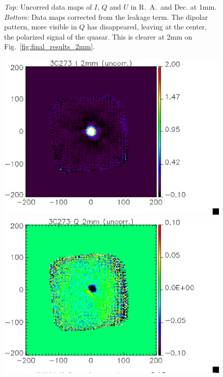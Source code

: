 \documentclass[a4paper,10pt]{article}
\begin{document}
\begin{figure}
\begin{center}
\caption{\emph{Top:} Uncorred data maps of $I$, $Q$ and $U$ in R.~A.~and Dec. at
  1mm. \emph{Bottom:} Data maps corrected from the leakage term. The dipolar
  pattern, more visible in $Q$ has disappeared, leaving at the center, the
  polarized signal of the quasar. This is clearer at 2mm on Fig.~\ref{fig:final_results_2mm}.}
\label{fig:final_results_1mm}
\end{center}
\end{figure}

\begin{figure}
\begin{center}
\includegraphics[clip, angle=0, scale = 0.3]{figures/I_3C273_2mm_uncorr.eps}
\includegraphics[clip, angle=0, scale = 0.3]{figures/Q_3C273_2mm_uncorr.eps}

\end{center}
\end{figure}
\end{document}

